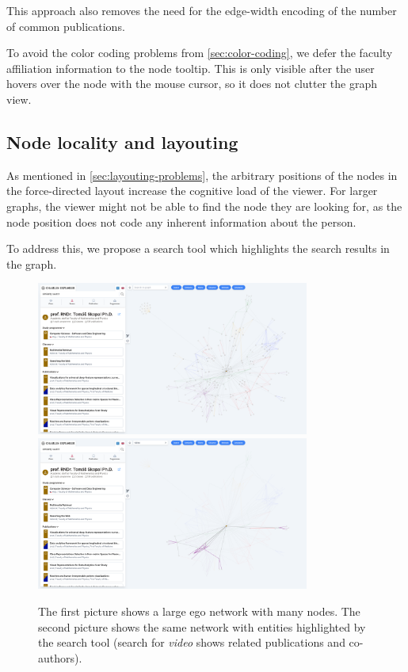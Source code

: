 This approach also removes the need for the edge-width encoding of the number of common publications.

To avoid the color coding problems from \ref{sec:color-coding}, we defer the faculty affiliation information to the node tooltip.
This is only visible after the user hovers over the node with the mouse cursor, so it does not clutter the graph view.

\subsection{Node locality and layouting}

As mentioned in \ref{sec:layouting-problems}, the arbitrary positions of the nodes in the force-directed layout increase the cognitive load of the viewer.
For larger graphs, the viewer might not be able to find the node they are looking for, as the node position does not code any inherent information about the person.

To address this, we propose a search tool which highlights the search results in the graph.

\begin{figure}[ht!]
    \captionsetup{width=.9\linewidth}
    \includegraphics[width=0.8\textwidth]{../img/big-network.png}
    \includegraphics[width=0.8\textwidth]{../img/big-network-search.png}
    \centering
    \caption{The first picture shows a large ego network with many nodes. The second picture shows the same network with entities highlighted by the search tool (search for \textit{video} shows related publications and co-authors).}
\end{figure}

